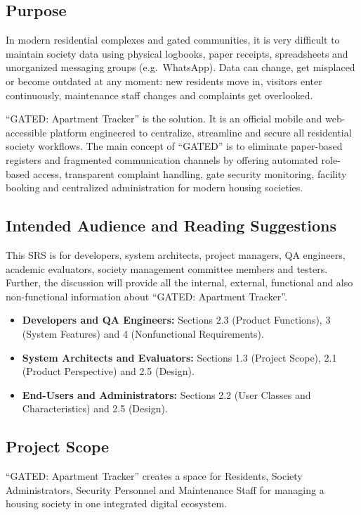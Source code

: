 \documentclass[a4paper,10pt]{scrartcl}
\numberwithin{figure}{section}
\begin{document}
\subsection{Purpose}
In modern residential complexes and gated communities, it is very difficult to maintain society data using physical logbooks, paper receipts, spreadsheets and unorganized messaging groups (e.g.\ WhatsApp). Data can change, get misplaced or become outdated at any moment: new residents move in, visitors enter continuously, maintenance staff changes and complaints get overlooked.

``GATED: Apartment Tracker'' is the solution. It is an official mobile and web-accessible platform engineered to centralize, streamline and secure all residential society workflows. The main concept of ``GATED'' is to eliminate paper-based registers and fragmented communication channels by offering automated role-based access, transparent complaint handling, gate security monitoring, facility booking and centralized administration for modern housing societies.

\subsection{Intended Audience and Reading Suggestions}
This SRS is for developers, system architects, project managers, QA engineers, academic evaluators, society management committee members and testers. Further, the discussion will provide all the internal, external, functional and also non-functional information about ``GATED: Apartment Tracker''.

\begin{itemize}
\item \textbf{Developers and QA Engineers:} Sections 2.3 (Product Functions), 3 (System Features) and 4 (Nonfunctional Requirements).
\item \textbf{System Architects and Evaluators:} Sections 1.3 (Project Scope), 2.1 (Product Perspective) and 2.5 (Design).
\item \textbf{End-Users and Administrators:} Sections 2.2 (User Classes and Characteristics) and 2.5 (Design).
\end{itemize}

\subsection{Project Scope}
``GATED: Apartment Tracker'' creates a space for Residents, Society Administrators, Security Personnel and Maintenance Staff for managing a housing society in one integrated digital ecosystem.
\end{document}
